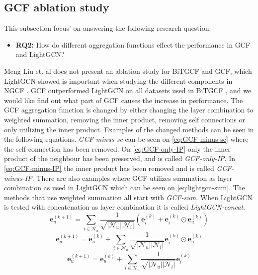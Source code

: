 \subsection{GCF ablation study}\label{subsec:method-gcf-ablation-study}
This subsection focus' on answering the following research question: 
\begin{itemize}
    \item \textbf{RQ2:} How do different aggregation functions effect the performance in GCF and LightGCN?
\end{itemize}
Meng Liu et. al does not present an ablation study for BiTGCF and GCF, which LightGCN showed is important when studying the different components in NGCF \cite{lightgcn,BiTGCF}.
GCF outperformed LightGCN on all datasets used in BiTGCF \cite{BiTGCF}, and we would like find out what part of GCF causes the increase in performance.
The GCF aggregation function is changed by either changing the layer combination to weighted summation, removing the inner product, removing self connections or only utilizing the inner product.
Examples of the changed methods can be seen in the following equations.
\textit{GCF-minus-sc} can be seen on \autoref{eq:GCF-minus-sc} where the self-connection has been removed.
On \autoref{eq:GCF-only-IP} only the inner product of the neighbour has been preserved, and is called \textit{GCF-only-IP}.
In \autoref{eq:GCF-minus-IP} the inner product has been removed and is called \textit{GCF-minus-IP}.
There are also examples where GCF utilizes summation as layer combination as used in LightGCN which can be seen on \autoref{eq:lightgcn-sum}.
The methods that use weighted summation all start with \textit{GCF-sum}.
When LightGCN is tested with concatenation as layer combination it is called \textit{LightGCN-concat}.
\begin{equation}
    \mathbf{e}_{u}^{(k+1)} = \sum^{}_{i \in \mathcal{N}_u}  \frac{1}{\sqrt{|\mathcal{N}_u||\mathcal{N}_i|}}\left( \mathbf{e}_i^{(k)} + \mathbf{e}_i^{(k)} \odot \mathbf{e}_u^{(k)} \right)
    \label{eq:GCF-minus-sc}
\end{equation}
\begin{equation}
    \mathbf{e}_{u}^{(k+1)} = \mathbf{e}_{u}^{(k)} + \sum^{}_{i \in \mathcal{N}_u}  \frac{1}{\sqrt{|\mathcal{N}_u||\mathcal{N}_i|}} \mathbf{e}_i^{(k)} \odot \mathbf{e}_u^{(k)}
    \label{eq:GCF-only-IP}
\end{equation}
\begin{equation}
    \mathbf{e}_{u}^{(k+1)} = \mathbf{e}_{u}^{(k)} + \sum^{}_{i \in \mathcal{N}_u}  \frac{1}{\sqrt{|\mathcal{N}_u||\mathcal{N}_i|}} \mathbf{e}_i^{(k)}
    \label{eq:GCF-minus-IP}
\end{equation}
